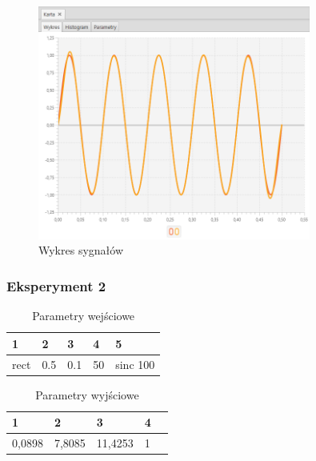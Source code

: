 \documentclass[12pt]{article}
\begin{document}
{{{                \begin{figure}[H]
                    \centering
                    \includegraphics[width=0.8\textwidth]{img/result/experiment2/01/data_draw_original_chart_recon_output_130327.png}
                    \caption{Wykres sygnałów}
                \end{figure}
            }
            \newpage

            \subsubsection{Eksperyment 2} {
                \begin{table}[H]
                    \centering
                    \begin{tabular}{|l|l|l|l|l|}
                        \hline
                        1 & 2 & 3 & 4 & 5   \\ \hline
                        rect & 0.5 & 0.1 & 50 & sinc 100  \\ \hline
                    \end{tabular}
                    \caption{Parametry wejściowe}
                \end{table}

                \begin{table}[H]
                    \centering
                    \begin{tabular}{|l|l|l|l|l|}
                        \hline
                        1 & 2 & 3 & 4   \\ \hline
                        0,0898 & 7,8085 & 11,4253 & 1  \\ \hline
                    \end{tabular}
                    \caption{Parametry wyjściowe}
                \end{table}


}}}
\end{document}
